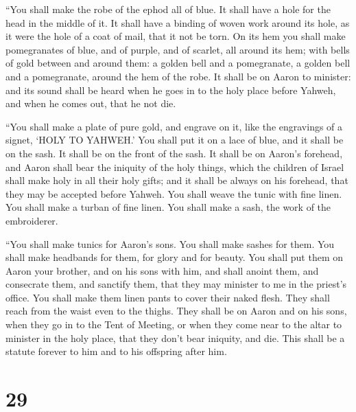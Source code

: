  ``You shall make the robe of the ephod all of blue.
 It shall have a hole for the head in the middle of it.
It shall have a binding of woven work around its hole, as it were the
hole of a coat of mail, that it not be torn.  On its hem
you shall make pomegranates of blue, and of purple, and of scarlet, all
around its hem; with bells of gold between and around them:
 a golden bell and a pomegranate, a golden bell and a
pomegranate, around the hem of the robe.  It shall be on
Aaron to minister: and its sound shall be heard when he goes in to the
holy place before Yahweh, and when he comes out, that he not die.

 ``You shall make a plate of pure gold, and engrave on
it, like the engravings of a signet, `HOLY TO YAHWEH.' 
You shall put it on a lace of blue, and it shall be on the sash. It
shall be on the front of the sash.  It shall be on
Aaron's forehead, and Aaron shall bear the iniquity of the holy things,
which the children of Israel shall make holy in all their holy gifts;
and it shall be always on his forehead, that they may be accepted before
Yahweh.  You shall weave the tunic with fine linen. You
shall make a turban of fine linen. You shall make a sash, the work of
the embroiderer.

 ``You shall make tunics for Aaron's sons. You shall make
sashes for them. You shall make headbands for them, for glory and for
beauty.  You shall put them on Aaron your brother, and on
his sons with him, and shall anoint them, and consecrate them, and
sanctify them, that they may minister to me in the priest's office.
 You shall make them linen pants to cover their naked
flesh. They shall reach from the waist even to the thighs.
 They shall be on Aaron and on his sons, when they go in
to the Tent of Meeting, or when they come near to the altar to minister
in the holy place, that they don't bear iniquity, and die. This shall be
a statute forever to him and to his offspring after him.

\hypertarget{section-28}{%
\section{29}\label{section-28}}

